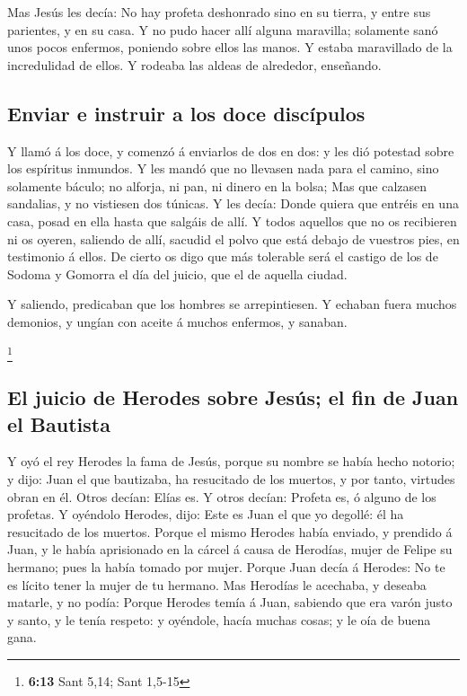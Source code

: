  Mas Jesús les decía: No hay profeta deshonrado sino en su
tierra, y entre sus parientes, y en su casa.  Y no pudo
hacer allí alguna maravilla; solamente sanó unos pocos enfermos,
poniendo sobre ellos las manos.  Y estaba maravillado de
la incredulidad de ellos. Y rodeaba las aldeas de alrededor, enseñando.

\hypertarget{enviar-e-instruir-a-los-doce-discuxedpulos}{%
\subsection{Enviar e instruir a los doce
discípulos}\label{enviar-e-instruir-a-los-doce-discuxedpulos}}

 Y llamó á los doce, y comenzó á enviarlos de dos en dos:
y les dió potestad sobre los espíritus inmundos.  Y les
mandó que no llevasen nada para el camino, sino solamente báculo; no
alforja, ni pan, ni dinero en la bolsa;  Mas que calzasen
sandalias, y no vistiesen dos túnicas.  Y les decía:
Donde quiera que entréis en una casa, posad en ella hasta que salgáis de
allí.  Y todos aquellos que no os recibieren ni os
oyeren, saliendo de allí, sacudid el polvo que está debajo de vuestros
pies, en testimonio á ellos. De cierto os digo que más tolerable será el
castigo de los de Sodoma y Gomorra el día del juicio, que el de aquella
ciudad.

 Y saliendo, predicaban que los hombres se arrepintiesen.
 Y echaban fuera muchos demonios, y ungían con aceite á
muchos enfermos, y sanaban.

\footnote{\textbf{6:13} Sant 5,14; Sant 1,5-15}

\hypertarget{el-juicio-de-herodes-sobre-jesuxfas-el-fin-de-juan-el-bautista}{%
\subsection{El juicio de Herodes sobre Jesús; el fin de Juan el
Bautista}\label{el-juicio-de-herodes-sobre-jesuxfas-el-fin-de-juan-el-bautista}}

 Y oyó el rey Herodes la fama de Jesús, porque su nombre
se había hecho notorio; y dijo: Juan el que bautizaba, ha resucitado de
los muertos, y por tanto, virtudes obran en él.  Otros
decían: Elías es. Y otros decían: Profeta es, ó alguno de los profetas.
 Y oyéndolo Herodes, dijo: Este es Juan el que yo
degollé: él ha resucitado de los muertos.  Porque el
mismo Herodes había enviado, y prendido á Juan, y le había aprisionado
en la cárcel á causa de Herodías, mujer de Felipe su hermano; pues la
había tomado por mujer.  Porque Juan decía á Herodes: No
te es lícito tener la mujer de tu hermano.  Mas Herodías
le acechaba, y deseaba matarle, y no podía:  Porque
Herodes temía á Juan, sabiendo que era varón justo y santo, y le tenía
respeto: y oyéndole, hacía muchas cosas; y le oía de buena gana.

